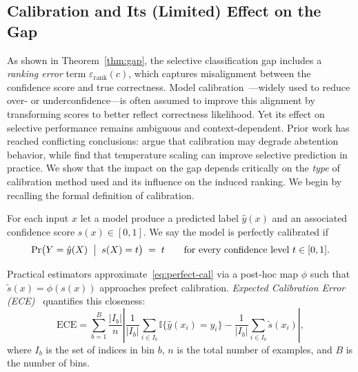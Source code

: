 \subsection{Calibration and Its (Limited) Effect on the Gap}
\label{sec:calibration-gap}

As shown in Theorem~\ref{thm:gap}, the selective classification gap includes a \emph{ranking error} term \(\varepsilon_{\text{rank}}(c)\), which captures misalignment between the confidence score and true correctness. Model calibration~\citep{niculescu2005predicting}—widely used to reduce over- or underconfidence—is often assumed to improve this alignment by transforming scores to better reflect correctness likelihood. Yet its effect on selective performance remains ambiguous and context-dependent. Prior work has reached conflicting conclusions: \citet{zhu2022rethinking} argue that calibration may degrade abstention behavior, while \citet{galil2023can} find that temperature scaling can improve selective prediction in practice. We show that the impact on the gap depends critically on the \emph{type} of calibration method used and its influence on the induced ranking. We begin by recalling the formal definition of calibration.

\begin{definition}
\label{def:calibration}
For each input \(x\) let a model produce a predicted label \(\hat y(x)\) and an associated confidence score \(s(x)\in[0,1]\). We say the model is perfectly calibrated if
\begin{equation}
  \Pr\bigl(Y = \hat y(X)\;\bigm|\;s(X)=t\bigr) \;=\; t \qquad \text{for every confidence level}\ t\in[0,1].
  \label{eq:perfect-cal}
\end{equation}
\end{definition}

Practical estimators approximate~\eqref{eq:perfect-cal} via a post-hoc map \(\phi\) such that \(\tilde s(x)=\phi(s(x))\) approaches prefect calibration. \emph{Expected Calibration Error (ECE)}~\citep{naeini2015obtaining} quantifies this closeness:
\begin{equation}
  \text{ECE} = \sum_{b=1}^B \frac{|I_b|}{n}
  \left| \frac{1}{|I_b|} \sum_{i \in I_b} \mathbb{I}\{ \hat y(x_i) = y_i \}
         - \frac{1}{|I_b|} \sum_{i \in I_b} \tilde s(x_i) \right|,
  \label{eq:ece}
\end{equation}
where \(I_b\) is the set of indices in bin \(b\), \(n\) is the total number
of examples, and \(B\) is the number of bins.

